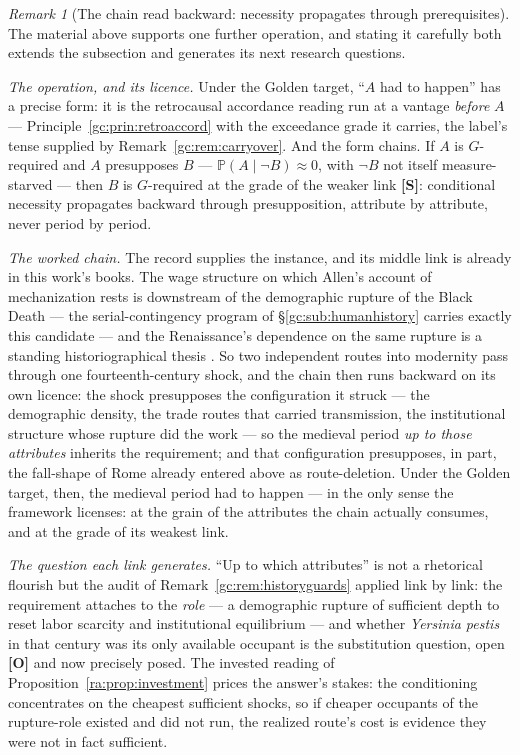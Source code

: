 \documentclass[11pt]{article}
\numberwithin{equation}{section}
\theoremstyle{plain}
\theoremstyle{definition}
\theoremstyle{remark}
\newtheorem{remark}[theorem]{Remark}
\newcommand{\PP}{\mathbb{P}}
\begin{document}
\begin{remark}[The chain read backward: necessity propagates through
prerequisites]\label{gc:rem:backwardchain}
The material above supports one further operation, and stating it
carefully both extends the subsection and generates its next research
questions.

\emph{The operation, and its licence.} Under the Golden target,
``$A$ had to happen'' has a precise form: it is the retrocausal
accordance reading run at a vantage \emph{before} $A$ ---
Principle~\ref{gc:prin:retroaccord} with the exceedance grade it
carries, the label's tense supplied by Remark~\ref{gc:rem:carryover}.
And the form chains. If $A$ is $G$-required and $A$ presupposes $B$
--- $\PP(A\mid\neg B)\approx0$, with $\neg B$ not itself
measure-starved --- then $B$ is $G$-required at the grade of the
weaker link \textbf{[S]}: conditional necessity propagates backward
through presupposition, attribute by attribute, never period by
period.

\emph{The worked chain.} The record supplies the instance, and its
middle link is already in this work's books. The wage structure on
which Allen's account of mechanization rests is downstream of the
demographic rupture of the Black Death --- the serial-contingency
program of \S\ref{gc:sub:humanhistory} carries exactly this
candidate --- and the Renaissance's dependence on the same rupture is
a standing historiographical thesis \cite{Herlihy97,Belich22}. So two
independent routes into modernity pass through one fourteenth-century
shock, and the chain then runs backward on its own licence: the shock
presupposes the configuration it struck --- the demographic density,
the trade routes that carried transmission, the institutional
structure whose rupture did the work --- so the medieval period
\emph{up to those attributes} inherits the requirement; and that
configuration presupposes, in part, the fall-shape of Rome already
entered above as route-deletion. Under the Golden target, then, the
medieval period had to happen --- in the only sense the framework
licenses: at the grain of the attributes the chain actually consumes,
and at the grade of its weakest link.

\emph{The question each link generates.} ``Up to which attributes''
is not a rhetorical flourish but the audit of
Remark~\ref{gc:rem:historyguards} applied link by link: the
requirement attaches to the \emph{role} --- a demographic rupture of
sufficient depth to reset labor scarcity and institutional
equilibrium --- and whether \emph{Yersinia pestis} in that century
was its only available occupant is the substitution question, open
\textbf{[O]} and now precisely posed. The invested reading of
Proposition~\ref{ra:prop:investment} prices the answer's stakes: the
conditioning concentrates on the cheapest sufficient shocks, so if
cheaper occupants of the rupture-role existed and did not run, the
realized route's cost is evidence they were not in fact sufficient.


\end{remark}
\end{document}
